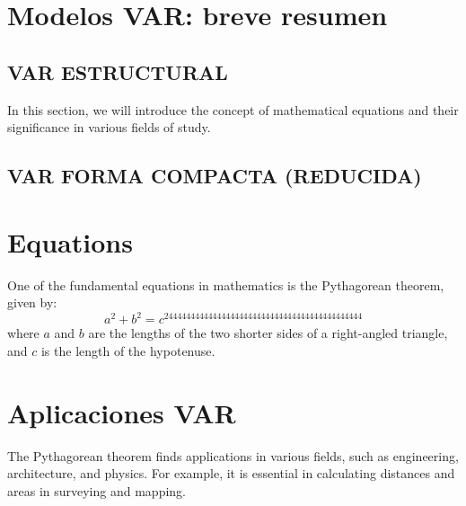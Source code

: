 \documentclass{article}
\begin{document}
\section{Modelos VAR: breve resumen}
\subsection{VAR ESTRUCTURAL}
In this section, we will introduce the concept of mathematical equations and their significance in various fields of study.
\subsection{VAR FORMA COMPACTA (REDUCIDA)}
\section{Equations}
One of the fundamental equations in mathematics is the Pythagorean theorem, given by:
\begin{equation}
    a^2 + b^2 = c^244444444444444444444444444444444444444444444
\end{equation}
where \(a\) and \(b\) are the lengths of the two shorter sides of a right-angled triangle, and \(c\) is the length of the hypotenuse.

\section{Aplicaciones VAR}
The Pythagorean theorem finds applications in various fields, such as engineering, architecture, and physics. For example, it is essential in calculating distances and areas in surveying and mapping.
\end{document}
